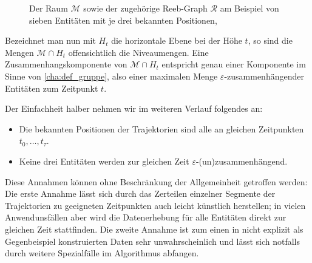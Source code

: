 \begin{figure}
	\centering%
	\hspace{1em}
	\caption{Der Raum $\mathcal{M}$ sowie der zugehörige Reeb-Graph $\mathcal{R}$ am Beispiel von sieben Entitäten mit je drei bekannten Positionen, \cite[Fig.~2]{buchin2015}}
\end{figure}

Bezeichnet man nun mit $H_t$ die horizontale Ebene bei der Höhe $t$, so sind die Mengen $\mathcal{M} \cap H_t$ offensichtlich die Niveaumengen.
Eine Zusammenhangskomponente von $\mathcal{M} \cap H_t$ entspricht genau einer Komponente im Sinne von \cref{cha:def_gruppe}, also einer maximalen Menge $\varepsilon$-zusammenhängender Entitäten zum Zeitpunkt $t$.

Der Einfachheit halber nehmen wir im weiteren Verlauf folgendes an:
\begin{itemize}
	\item Die bekannten Positionen der Trajektorien sind alle an gleichen Zeitpunkten $t_0, \ldots ,t_\tau$.
	\item Keine drei Entitäten werden zur gleichen Zeit $\varepsilon$-(un)zusammenhängend.
\end{itemize}
Diese Annahmen können ohne Beschränkung der Allgemeinheit getroffen werden:
Die erste Annahme lässt sich durch das Zerteilen einzelner Segmente der Trajektorien zu geeigneten Zeitpunkten auch leicht künstlich herstellen; in vielen Anwendunsfällen aber wird die Datenerhebung für alle Entitäten direkt zur gleichen Zeit stattfinden.
Die zweite Annahme ist zum einen in nicht explizit als Gegenbeispiel konstruierten Daten sehr unwahrscheinlich und lässt sich notfalls durch weitere Spezialfälle im Algorithmus abfangen.

